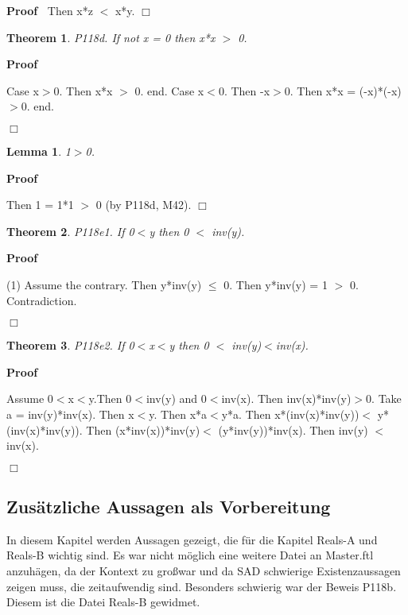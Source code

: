 \documentclass{article}
\newenvironment{forthel}{\begin{leftbar}}{\end{leftbar}}
\newenvironment{proof}{\noindent\textbf{Proof\ }}{\hspace*{\fill}$\Box$\medskip}
\newtheorem{lemma}{Lemma}
\newtheorem{theorem}{Theorem}
\begin{document}
\begin{forthel}
\begin{proof}
	Then x*z $<$ x*y.
	\end{proof}

	
	\begin{theorem}
 P118d. If not x = 0 then x*x $>$ 0.
\end{theorem}	\begin{proof}

	Case x$>$0. Then x*x $>$ 0.
	end.
	Case x$<$0. Then -x$>$0. Then x*x = (-x)*(-x)$>$0.
	end.
	
	\end{proof}

	\begin{lemma} 1$>$0. 

\end{lemma}
	\begin{proof}

	Then 1 = 1*1 $>$ 0 (by P118d, M42).
	\end{proof}

	
	\begin{theorem}
 P118e1. If 0$<$y then 0 $<$ inv(y).
\end{theorem}	\begin{proof}

	(1) Assume the contrary.
	Then y*inv(y) $\leq$ 0.
	Then y*inv(y) = 1 $>$ 0.
	Contradiction.
	
	\end{proof}

	\begin{theorem}
 P118e2. If 0$<$x$<$y then 0 $<$ inv(y)$<$inv(x).
\end{theorem}	\begin{proof}
 
	Assume 0$<$x$<$y.Then 0$<$inv(y) and 0$<$inv(x).
	Then inv(x)*inv(y)$>$0.
	Take a = inv(y)*inv(x).	
	Then x$<$y. Then x*a$<$y*a.
	Then x*(inv(x)*inv(y))$<$ y*(inv(x)*inv(y)).
	Then (x*inv(x))*inv(y)$<$ (y*inv(y))*inv(x).
	Then inv(y) $<$ inv(x).
	
	\end{proof}

	

\end{forthel}








\subsection{Zus\"atzliche Aussagen als Vorbereitung}
In diesem Kapitel werden Aussagen gezeigt, die f\"ur die Kapitel Reals-A und Reals-B wichtig sind.
Es war nicht m\"oglich eine weitere Datei an Master.ftl anzuh\"agen, da der Kontext zu gro\ss \enspace war
und da SAD schwierige Existenzaussagen zeigen muss, die zeitaufwendig sind. Besonders schwierig war der Beweis P118b. Diesem ist die Datei Reals-B gewidmet.
 
\end{document}
